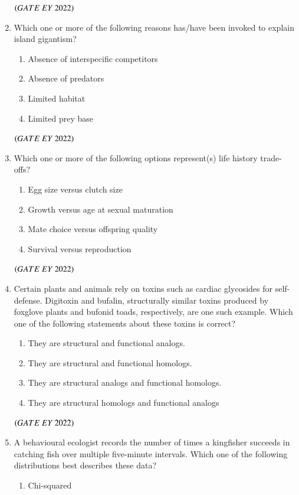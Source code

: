 \documentclass[journal]{IEEEtran}
\numberwithin{equation}{enumi}
\numberwithin{figure}{enumi}
\begin{document}
\begin{enumerate}
    \hfill{$\brak{ GATE\ EY\ 2022}$}
    \bigskip
 \item Which one or more of the following reasons has/have been invoked to explain
island gigantism?
    \begin{enumerate}
        \item  Absence of interspecific competitors
        \item  Absence of predators
        \item  Limited habitat
        \item  Limited prey base
    \end{enumerate}
    \hfill{$\brak{ GATE\ EY\ 2022}$}
    \bigskip
 \item Which one or more of the following options represent(s) life history trade-offs?
    \begin{enumerate}
        \item  Egg size versus clutch size
        \item  Growth versus age at sexual maturation
        \item  Mate choice versus offspring quality
        \item  Survival versus reproduction
    \end{enumerate}
    \hfill{$\brak{ GATE\ EY\ 2022}$}
    \bigskip
 \item Certain plants and animals rely on toxins such as cardiac glycosides for self-defense.
Digitoxin and bufalin, structurally similar toxins produced by foxglove plants and
bufonid toads, respectively, are one such example. Which one of the following
statements about these toxins is correct?
    \begin{enumerate}
        \item  They are structural and functional analogs.
        \item  They are structural and functional homologs.
        \item  They are structural analogs and functional homologs.
        \item  They are structural homologs and functional analogs
    \end{enumerate}
    \hfill{$\brak{ GATE\ EY\ 2022}$}
    \bigskip
 \item A behavioural ecologist records the number of times a kingfisher succeeds in catching
fish over multiple five-minute intervals. Which one of the following distributions best
describes these data?
    \begin{enumerate}
        \item  Chi-squared

\end{enumerate}
\end{enumerate}
\end{document}
